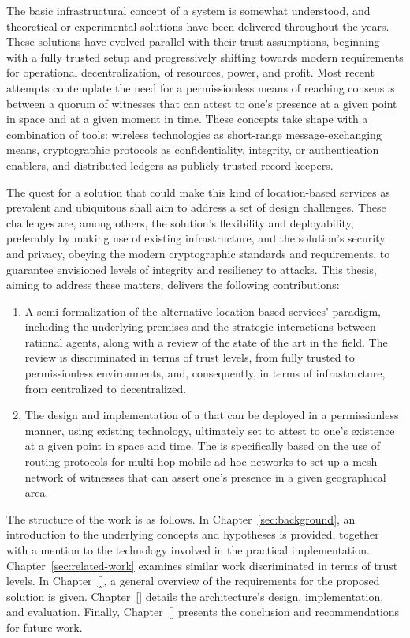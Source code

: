 The basic infrastructural concept of a \pol system is somewhat understood, and theoretical or experimental solutions have been delivered throughout the years. These solutions have evolved parallel with their trust assumptions, beginning with a fully trusted setup and progressively shifting towards modern requirements for operational decentralization, of resources, power, and profit. Most recent attempts contemplate the need for a permissionless means of reaching consensus between a quorum of witnesses that can attest to one's presence at a given point in space and at a given moment in time. These concepts take shape with a combination of tools: wireless technologies as short-range message-exchanging means, cryptographic protocols as confidentiality, integrity, or authentication enablers, and distributed ledgers as publicly trusted record keepers. 

The quest for a solution that could make this kind of location-based services as prevalent and ubiquitous shall aim to address a set of design challenges. These challenges are, among others, the solution's flexibility and deployability, preferably by making use of existing infrastructure, and the solution's security and privacy, obeying the modern cryptographic standards and requirements, to guarantee envisioned levels of integrity and resiliency to attacks. This thesis, aiming to address these matters, delivers the following contributions:
\begin{enumerate}
\item A semi-formalization of the alternative location-based services' paradigm, including the underlying premises and the strategic interactions between rational agents, along with a review of the state of the art in the field. The review is discriminated in terms of trust levels, from fully trusted to permissionless environments, and, consequently, in terms of infrastructure, from centralized to decentralized.
\item The design and implementation of a \poc that can be deployed in a permissionless manner, using existing technology, ultimately set to attest to one's existence at a given point in space and time. The \poc is specifically based on the use of routing protocols for multi-hop mobile ad hoc networks to set up a mesh network of witnesses that can assert one's presence in a given geographical area.
\end{enumerate}

The structure of the work is as follows. In Chapter~\ref{sec:background}, an introduction to the underlying concepts and hypotheses is provided, together with a mention to the technology involved in the practical implementation. Chapter~\ref{sec:related-work} examines similar work discriminated in terms of trust levels. In Chapter~\ref{}, a general overview of the requirements for the proposed solution is given. Chapter~\ref{} details the architecture's design, implementation, and evaluation. Finally, Chapter~\ref{} presents the conclusion and recommendations for future work.
